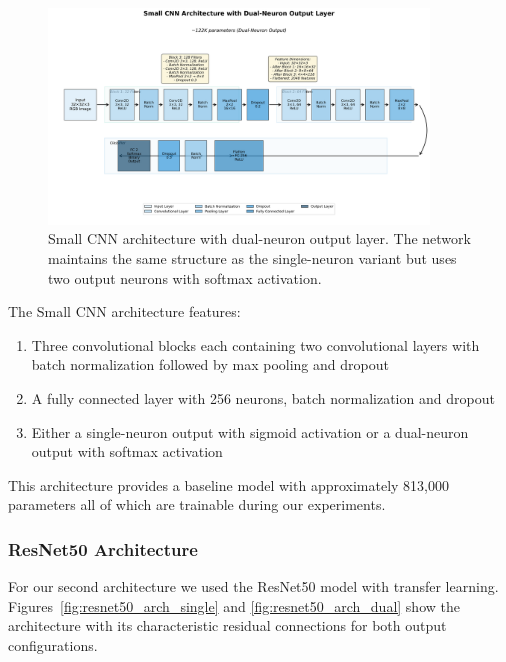 \begin{figure}[!htbp]
\centering
\includegraphics[width=0.9\textwidth]{figures/small_cnn_2neuron_architecture.png}
\caption{Small CNN architecture with dual-neuron output layer. The network maintains the same structure as the single-neuron variant but uses two output neurons with softmax activation.}
\label{fig:small_cnn_arch_dual}
\end{figure}

The Small CNN architecture features:
\begin{enumerate}
\item Three convolutional blocks each containing two convolutional layers with batch normalization followed by max pooling and dropout
\item A fully connected layer with 256 neurons, batch normalization and dropout
\item Either a single-neuron output with sigmoid activation or a dual-neuron output with softmax activation
\end{enumerate}

This architecture provides a baseline model with approximately 813,000 parameters all of which are trainable during our experiments.

\FloatBarrier
\subsubsection{ResNet50 Architecture}

For our second architecture we used the ResNet50 model with transfer learning. Figures~\ref{fig:resnet50_arch_single} and \ref{fig:resnet50_arch_dual} show the architecture with its characteristic residual connections for both output configurations.

